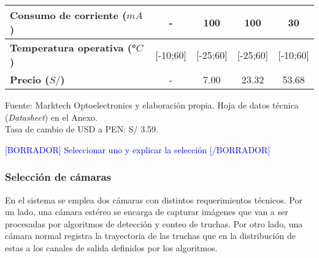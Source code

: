 \begin{mytable}[H]
\begin{tabular}{l|c|c|c|c|}
{			\begin{minipage}{\myforthmaxsizeofcontenttable}	
				\textbf{Consumo de corriente ($mA$)}
			\end{minipage}
		} & -  & 100 & 100 & 30         \\ \hline
		\multicolumn{1}{|l|}{
			\begin{minipage}{\myforthmaxsizeofcontenttable}	
				\textbf{Temperatura operativa (°$C$)}
			\end{minipage}
		} & [-10;60] & [-25;60] & [-25;60] & [-10;60] \\ \hline
		\multicolumn{1}{|l|}{
			\begin{minipage}{\myforthmaxsizeofcontenttable}	
				\textbf{Precio ($S/$)}
			\end{minipage}
		} & - & 7.00 & 23.32 & 53.68 \\ \hline
	\end{tabular}
	\begin{myflushcenteraftertable}	
		Fuente: Marktech Optoelectronics y elaboración propia. Hoja de datos técnica (\textit{Datasheet}) en el Anexo.\\
		Tasa de cambio de USD a PEN: S/ 3.59.
	\end{myflushcenteraftertable}
\end{mytable}

\textcolor{blue}{[BORRADOR] Seleccionar uno y explicar la selección [/BORRADOR]}

\subsubsection{Selección de cámaras} 

En el sistema se emplea dos cámaras con distintos requerimientos técnicos. Por un lado, una cámara estéreo se encarga de capturar imágenes que van a ser procesadas por algoritmos de detección y conteo de truchas. Por otro lado, una cámara normal registra la trayectoria de las truchas que en la distribución de estas a los canales de salida definidos por los algoritmos. 

